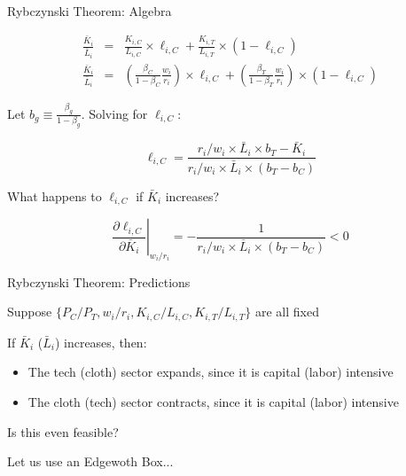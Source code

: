 \documentclass[notes,11pt, aspectratio=169, xcolor=table]{beamer}
\newenvironment{wideitemize}{\itemize\addtolength{\itemsep}{10pt}}{\enditemize}
\begin{document}
\begin{frame}{Rybczynski Theorem: Algebra}

    \begin{eqnarray*}
         \frac{\bar{K}_i}{\bar{L}_i} &=& \frac{K_{i,C}}{L_{i,C}} \times \ell_{i,C} + \frac{K_{i,T}}{L_{i,T}} \times (1-\ell_{i,C}) \\
         \frac{\bar{K}_i}{\bar{L}_i} &=& \left( \frac{\beta_C}{1-\beta_C} \frac{w_i}{r_i} \right) \times \ell_{i,C} + \left( \frac{\beta_T}{1-\beta_T} \frac{w_i}{r_i} \right) \times (1-\ell_{i,C})
    \end{eqnarray*}

\begin{wideitemize}
    \item<2-> Let $b_g \equiv \frac{\beta_g}{1-\beta_g}$. Solving for $\ell_{i,C}$:

\begin{equation*}
    \ell_{i,C} = \frac{ r_i /w_i \times\bar{L}_i \times  b_T-  \bar{K}_i }{r_i /w_i \times\bar{L}_i\times(b_T - b_C)}
\end{equation*}

    \item<3-> What happens to $\ell_{i,C}$ if $\bar{K}_i$ increases?

\begin{equation*}
    \left. \frac{\partial  \ell_{i,C}}{\partial \bar{K}_i} \right|_{w_i / r_i} = - \frac{ 
    1}{r_i /w_i \times\bar{L}_i\times(b_T - b_C)} < 0
\end{equation*}    

\end{wideitemize}
\end{frame}


\begin{frame}{Rybczynski Theorem: Predictions}

\begin{wideitemize}
    \item Suppose $\{ P_C/P_T, w_i/r_i, K_{i,C}/L_{i,C},K_{i,T}/L_{i,T}\}$ are all fixed

    \item If $\bar{K}_i$ ($\bar{L}_i$) increases, then:

    \begin{itemize}
        \item The tech (cloth) sector expands, since it is capital (labor) intensive
        \item The cloth (tech) sector contracts, since it is capital (labor) intensive
    \end{itemize}

    \item Is this even feasible?

    \item Let us use an Edgewoth Box...

\end{wideitemize}
\end{frame}
\end{document}
